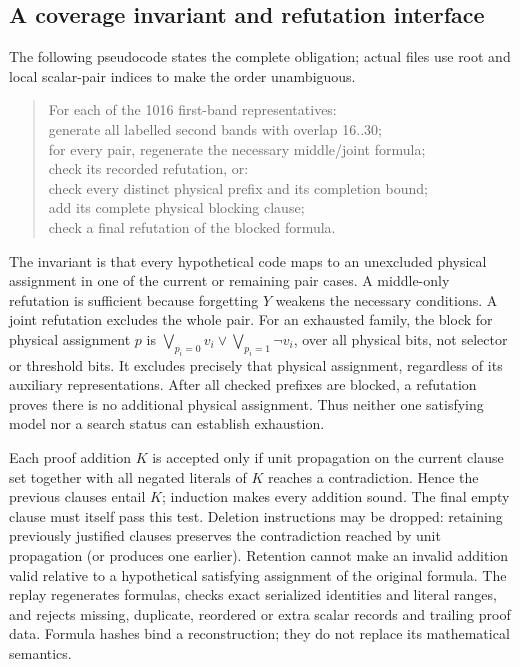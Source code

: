 \documentclass[11pt]{article}
\theoremstyle{definition}
\begin{document}
\subsection{A coverage invariant and refutation interface}
The following pseudocode states the complete obligation; actual files
use root and local scalar-pair indices to make the order unambiguous.
\begin{quote}\ttfamily\small
For each of the 1016 first-band representatives:\\
\hspace*{1em}generate all labelled second bands with overlap 16..30;\\
\hspace*{1em}for every pair, regenerate the necessary middle/joint formula;\\
\hspace*{2em}check its recorded refutation, or:\\
\hspace*{2em}check every distinct physical prefix and its completion bound;\\
\hspace*{2em}add its complete physical blocking clause;\\
\hspace*{2em}check a final refutation of the blocked formula.
\end{quote}
The invariant is that every hypothetical code maps to an unexcluded
physical assignment in one of the current or remaining pair cases.
A middle-only refutation is sufficient because forgetting $Y$ weakens
the necessary conditions. A joint refutation excludes the whole pair.
For an exhausted family, the block for physical assignment $p$ is
$\bigvee_{p_i=0}v_i\vee\bigvee_{p_i=1}\neg v_i$, over all physical
bits, not selector or threshold bits. It excludes precisely that physical
assignment, regardless of its auxiliary representations. After all
checked prefixes are blocked, a refutation proves there is no additional
physical assignment. Thus neither one satisfying model nor a search
status can establish exhaustion.

Each proof addition $K$ is accepted only if unit propagation on the
current clause set together with all negated literals of $K$ reaches a
contradiction. Hence the previous clauses entail $K$; induction makes
every addition sound. The final empty clause must itself pass this test.
Deletion instructions may be dropped: retaining previously justified
clauses preserves the contradiction reached by unit propagation (or
produces one earlier). Retention cannot make an invalid addition valid
relative to a hypothetical satisfying assignment of the original formula.
The replay regenerates formulas, checks exact serialized identities and
literal ranges, and rejects missing, duplicate, reordered or extra scalar
records and trailing proof data. Formula hashes bind a reconstruction;
they do not replace its mathematical semantics.
\end{document}
